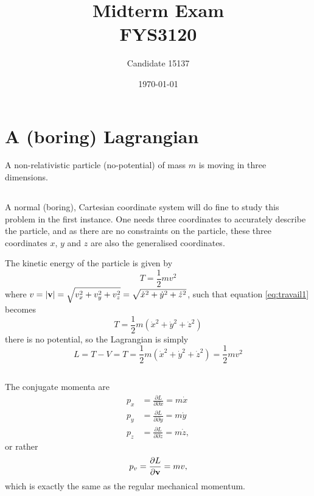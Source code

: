 \documentclass[11pt]{amsart}
\title[FYS3120 Midterm]{Midterm Exam\\	 
		\hrulefill \small{ FYS3120 } \hrulefill}
\author[15137]{Candidate 15137}
\date{\today}
\begin{document}
\maketitle

\section{A (boring) Lagrangian}
A non-relativistic particle (no-potential) of mass $m$ is moving in three dimensions.

\subsection{}
A normal (boring), Cartesian coordinate system will do fine to study this problem in the first instance. One needs three coordinates to accurately describe the particle, and as there are no constraints on the particle, these three coordinates $x$, $y$ and $z$ are also the generalised coordinates.

The kinetic energy of the particle is given by
\begin{equation}
\label{eq:travail1}
T = \frac{1}{2}mv^2
\end{equation}
where $v = \abs{\vb{v}} = \sqrt{v_x^2 + v_y^2 + v_z^2} = \sqrt{\dot{x}^2 + \dot{y}^2 + \dot{z}^2}$, such that equation \ref{eq:travail1} becomes
\begin{equation}
T = \frac{1}{2}m(\dot{x}^2 + \dot{y}^2 + \dot{z}^2)
\end{equation}
there is no potential, so the Lagrangian is simply
\begin{equation}
L = T - V = T = \frac{1}{2}m(\dot{x}^2 + \dot{y}^2 + \dot{z}^2) = \frac{1}{2}mv^2
\end{equation}

\subsection{}
The conjugate momenta are
\begin{align*}
p_x &= \frac{\partial L}{\partial \partial \dot{x}} = m\dot{x} \\
p_y &= \frac{\partial L}{\partial \partial \dot{y}} = m\dot{y} \\
p_z &= \frac{\partial L}{\partial \partial \dot{z}} = m\dot{z}, 
\end{align*}
or rather
\begin{equation}
p_v = \frac{\partial L}{\partial \vb{v}} = mv,
\end{equation}
which is exactly the same as the regular mechanical momentum.
\end{document}
